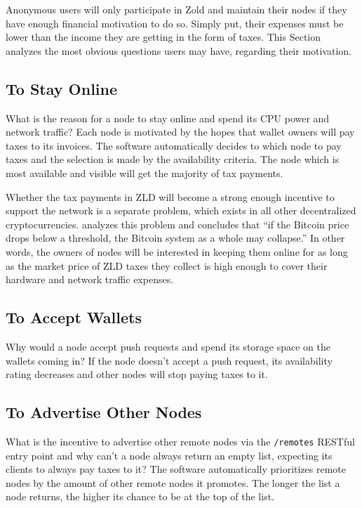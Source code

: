 \documentclass[11pt,oneside]{article}
\newcommand\dd[1]{\colorbox{gray!30}{\texttt{#1}}}
\begin{document}
Anonymous users will only participate in Zold and maintain
their nodes if they have enough financial motivation to do so. Simply
put, their expenses must be lower than the income they are getting in
the form of taxes. This Section analyzes the most obvious questions users
may have, regarding their motivation.

\subsection{To Stay Online}

What is the reason for a node to stay online and spend its CPU power
and network traffic? Each node is motivated by the
hopes that wallet owners will pay taxes to its invoices. The software
automatically decides to which node to pay taxes and the selection is
made by the availability criteria. The node which is most available
and visible will get the majority of tax payments.

Whether the tax payments in ZLD will become a strong enough incentive
to support the network is a separate problem, which exists in all
other decentralized cryptocurrencies. \textcite{iwamura2014} analyzes this
problem and concludes that ``if the Bitcoin price drops below
a threshold, the Bitcoin system as a whole may collapse.'' In other words,
the owners of nodes will be interested in keeping them online for as long
as the market price of ZLD taxes they collect is high enough to cover
their hardware and network traffic expenses.

\subsection{To Accept Wallets}

Why would a node accept push requests and spend its storage space
on the wallets coming in? If the node doesn't accept a push request,
its availability rating decreases and other nodes will stop paying
taxes to it.

\subsection{To Advertise Other Nodes}

What is the incentive to advertise other remote nodes via the \dd{/remotes} RESTful
entry point and why can't a node always return an empty list, expecting its clients
to always pay taxes to it? The software automatically prioritizes remote
nodes by the amount of other remote nodes it promotes. The longer the list a node
returns, the higher its chance to be at the top of the list.
\end{document}
